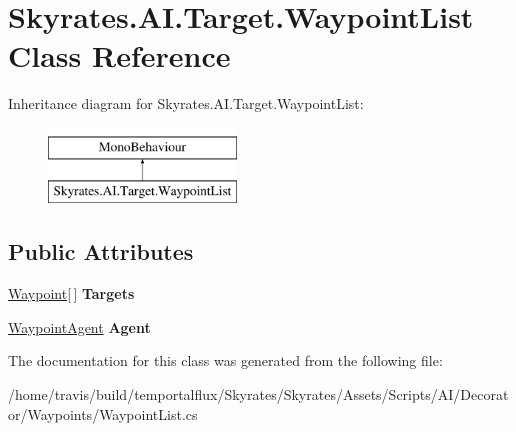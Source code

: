 \hypertarget{class_skyrates_1_1_a_i_1_1_target_1_1_waypoint_list}{\section{Skyrates.\-A\-I.\-Target.\-Waypoint\-List Class Reference}
\label{class_skyrates_1_1_a_i_1_1_target_1_1_waypoint_list}
}
Inheritance diagram for Skyrates.\-A\-I.\-Target.\-Waypoint\-List\-:\begin{figure}[H]
\begin{center}
\leavevmode
\includegraphics[height=2.000000cm]{class_skyrates_1_1_a_i_1_1_target_1_1_waypoint_list}
\end{center}
\end{figure}
\subsection*{Public Attributes}
\begin{DoxyCompactItemize}
\item 
\hypertarget{class_skyrates_1_1_a_i_1_1_target_1_1_waypoint_list_aa03041895a602f8fcdfcabd8a7d7e219}{\hyperlink{class_skyrates_1_1_a_i_1_1_target_1_1_waypoint}{Waypoint}\mbox{[}$\,$\mbox{]} {\bfseries Targets}}\label{class_skyrates_1_1_a_i_1_1_target_1_1_waypoint_list_aa03041895a602f8fcdfcabd8a7d7e219}

\item 
\hypertarget{class_skyrates_1_1_a_i_1_1_target_1_1_waypoint_list_aa62561cdd645051e53061add8f7bf407}{\hyperlink{class_skyrates_1_1_a_i_1_1_target_1_1_waypoint_agent}{Waypoint\-Agent} {\bfseries Agent}}\label{class_skyrates_1_1_a_i_1_1_target_1_1_waypoint_list_aa62561cdd645051e53061add8f7bf407}

\end{DoxyCompactItemize}


The documentation for this class was generated from the following file\-:\begin{DoxyCompactItemize}
\item 
/home/travis/build/temportalflux/\-Skyrates/\-Skyrates/\-Assets/\-Scripts/\-A\-I/\-Decorator/\-Waypoints/Waypoint\-List.\-cs\end{DoxyCompactItemize}
